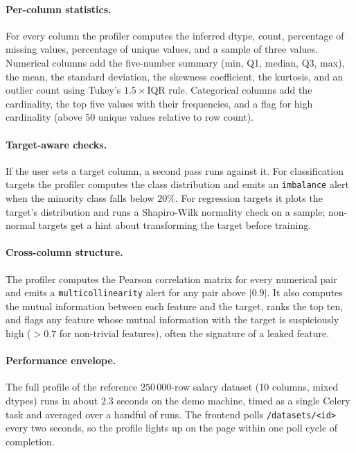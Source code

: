 \documentclass[12pt, a4paper, oneside]{report}
\begin{document}
\paragraph{Per-column statistics.} For every column the profiler
computes the inferred dtype, count, percentage of missing values,
percentage of unique values, and a sample of three values. Numerical
columns add the five-number summary (min, Q1, median, Q3, max), the
mean, the standard deviation, the skewness coefficient, the kurtosis,
and an outlier count using Tukey's $1.5 \times \text{IQR}$ rule.
Categorical columns add the cardinality, the top five values with
their frequencies, and a flag for high cardinality (above 50 unique
values relative to row count).

\paragraph{Target-aware checks.} If the user sets a target column, a
second pass runs against it. For classification targets the profiler
computes the class distribution and emits an \texttt{imbalance} alert
when the minority class falls below $20\%$. For regression targets it
plots the target's distribution and runs a Shapiro-Wilk normality
check on a sample; non-normal targets get a hint about transforming
the target before training.

\paragraph{Cross-column structure.} The profiler computes the
Pearson correlation matrix for every numerical pair and emits a
\texttt{multicollinearity} alert for any pair above $|0.9|$. It also
computes the mutual information between each feature and the target,
ranks the top ten, and flags any feature whose mutual information
with the target is suspiciously high ($> 0.7$ for non-trivial
features), often the signature of a leaked feature.

\paragraph{Performance envelope.} The full profile of the reference
$250\,000$-row salary dataset (10 columns, mixed dtypes) runs in
about $2.3$ seconds on the demo machine, timed as a single Celery
task and averaged over a handful of runs. The frontend polls
\texttt{/datasets/<id>} every two seconds, so the profile lights up
on the page within one poll cycle of completion.
\end{document}
